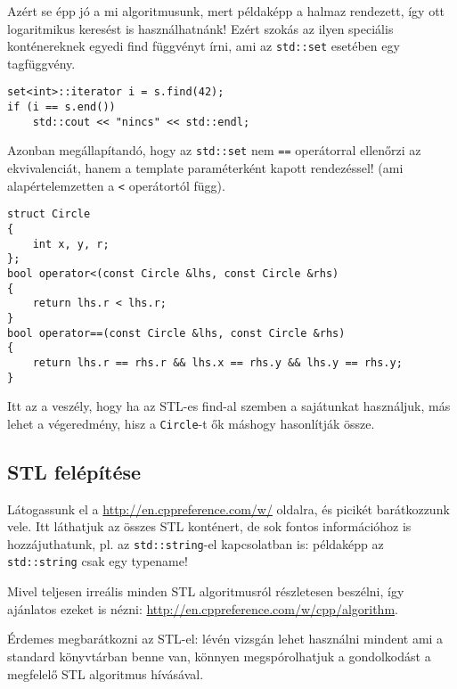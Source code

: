 \documentclass[a4paper,11.5pt]{article}
\begin{document}
	\medskip
	Azért se épp jó a mi algoritmusunk, mert példaképp a halmaz rendezett, így ott logaritmikus keresést is használhatnánk! Ezért szokás az ilyen speciális konténereknek egyedi find függvényt írni, ami az \texttt{std::set} esetében egy tagfüggvény. 
\begin{lstlisting}
set<int>::iterator i = s.find(42);
if (i == s.end())
	std::cout << "nincs" << std::endl;
\end{lstlisting}
	Azonban megállapítandó, hogy az \texttt{std::set} nem \texttt{==} operátorral ellenőrzi az ekvivalenciát, hanem a template paraméterként kapott rendezéssel! (ami alapértelemzetten a \texttt{<} operátortól függ).
\begin{lstlisting}
struct Circle
{
	int x, y, r;
};
bool operator<(const Circle &lhs, const Circle &rhs)
{
	return lhs.r < lhs.r;
}
bool operator==(const Circle &lhs, const Circle &rhs)
{
	return lhs.r == rhs.r && lhs.x == rhs.y && lhs.y == rhs.y;
}
\end{lstlisting}
	Itt az a veszély, hogy ha az STL-es find-al szemben a sajátunkat használjuk, más lehet a végeredmény, hisz a \texttt{Circle}-t ők máshogy hasonlítják össze.
	\subsection{STL felépítése}
	Látogassunk el a \url{http://en.cppreference.com/w/} oldalra, és picikét barátkozzunk vele. Itt láthatjuk az összes STL konténert, de sok fontos információhoz is hozzájuthatunk, pl. az \texttt{std::string}-el kapcsolatban is: példaképp az \texttt{std::string} csak egy typename!
	
	Mivel teljesen irreális minden STL algoritmusról részletesen beszélni, így ajánlatos ezeket is nézni: \url{http://en.cppreference.com/w/cpp/algorithm}.
	
	Érdemes megbarátkozni az STL-el: lévén vizsgán lehet használni mindent ami a standard könyvtárban benne van, könnyen megspórolhatjuk a gondolkodást a megfelelő STL algoritmus hívásával.
	
\end{document}
